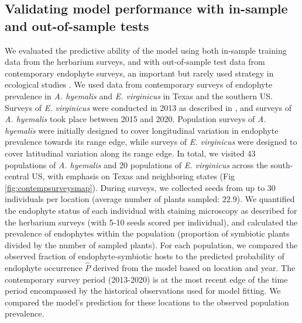\documentclass[11pt]{article}
\let\cite\citep
\newcommand{\tom}[2]{{\color{red}{#1}}\footnote{\textit{\color{red}{#2}}}}
\begin{document}
\subsection*{Validating model performance with in-sample and out-of-sample tests}
We evaluated the predictive ability of the model using both in-sample training data from the herbarium surveys, and with out-of-sample test data from contemporary endophyte surveys, an important but rarely used strategy in ecological studies \cite{tredennick2021practical, lee2024phenological}.
We used data from contemporary surveys of endophyte prevalence  in \emph{A. hyemalis} and \emph{E. virginicus} in Texas and the southern US. 
Surveys of \emph{E. virginicus} were conducted in 2013 as described in \citet{sneck2017variation}, and surveys of \emph{A. hyemalis} took place between 2015 and 2020.
Population surveys of \emph{A. hyemalis} were initially designed to cover longitudinal variation in endophyte prevalence towards its range edge, while surveys of \emph{E. virginicus} were designed to cover latitudinal variation along its range edge. 
In total, we visited 43 populations of \emph{A. hyemalis} and 20 populations of \emph{E. virginicus} across the south-central US, with emphasis on Texas and neighboring states (Fig \ref{fig:contempsurveysmap}).
During surveys, we collected seeds from up to 30 individuals per location  (average number of plants sampled: $22.9$).
We quantified the endophyte status of each individual with staining microscopy as described for the herbarium surveys (with 5-10 seeds scored per individual), and calculated the prevalence of endophytes within the population (proportion of symbiotic plants divided by the number of sampled plants).
For each population, we compared the observed fraction of endophyte-symbiotic hosts to the predicted probability of endophyte occurrence $\hat{P}$ derived from the model based on location and year. 
The contemporary survey period (2013-2020) is at the most recent edge of the time period encompassed by the historical observations used for model fitting.
We compared the model's prediction for these locations to the observed population prevalence.
\end{document}
